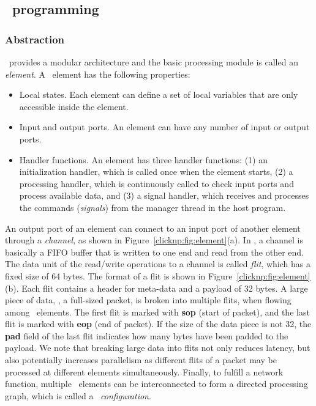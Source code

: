 \subsection{\name\ programming}

\subsubsection{Abstraction}

\name\ provides a modular architecture and the basic processing module is called an \textit{element}.
A \name\ element has the following properties: 
\begin{itemize}
\item Local states. Each element can define a set of local variables that are only accessible inside the element. 
\item Input and output ports. An element can have any number of input or output ports. 
\item Handler functions. An element has three handler functions: (1) an initialization handler, which is called once when the
element starts, (2) a processing handler, which is continuously called to check input ports and process available data,
and (3) a signal handler, which receives and processes the commands (\textit{signals}) from the manager thread in the host program.
\end{itemize}

%
An output port of an element can connect to an input port of another element through a \textit{channel}, as shown in Figure~\ref{clicknp:fig:element}(a).
In \name, a channel is basically a FIFO buffer that is written to one end and read from the other end.
The data unit of the read/write operations to a channel is called \textit{flit}, which has a fixed size of 64 bytes.
The format of a flit is shown in Figure~\ref{clicknp:fig:element}(b). Each flit contains a header for meta-data and a payload of 32 bytes.
A large piece of data, \eg, a full-sized packet, is broken into multiple flits, when flowing among \name\ elements.
The first flit is marked with \textbf{sop} (start of packet), and the last flit is marked with \textbf{eop} (end of packet). 
If the size of the data piece is not 32, the \textbf{pad} field of the last flit indicates how many bytes have been padded to the payload. 
We note that breaking large data into flits not only reduces latency, but also potentially increases parallelism as
different flits of a packet may be processed at different elements simultaneously.
%
Finally, to fulfill a network function, multiple \name\ elements can be interconnected to form a directed processing graph, which 
is called a \name\ \textit{configuration}. 

